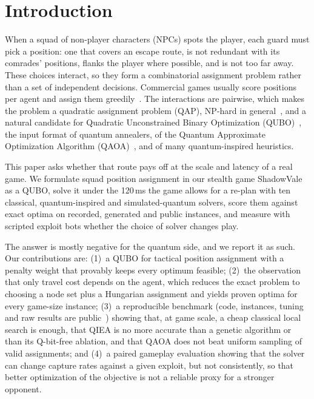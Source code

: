 \documentclass[sigconf]{acmart}
\begin{document}
\section{Introduction}

When a squad of non-player characters (NPCs) spots the player, each guard must pick a position: one
that covers an escape route, is not redundant with its comrades' positions, flanks the player where
possible, and is not too far away. These choices interact, so they form a combinatorial
assignment problem rather than a set of independent decisions. Commercial games usually score
positions per agent and assign them greedily~\cite{Straatman2005,Orkin2006,Jack2013}. The
interactions are pairwise, which makes the problem a quadratic assignment problem (QAP), NP-hard in
general~\cite{Sahni1976}, and a natural candidate for Quadratic Unconstrained Binary Optimization
(QUBO)~\cite{Lucas2014,Glover2019}, the input format of quantum annealers, of the Quantum Approximate
Optimization Algorithm (QAOA)~\cite{Farhi2014}, and of many quantum-inspired heuristics.

This paper asks whether that route pays off at the scale and latency of a real game. We
formulate squad position assignment in our stealth game ShadowVale as a QUBO, solve it under the
120\,ms the game allows for a re-plan with ten classical, quantum-inspired and simulated-quantum
solvers, score them against exact optima on recorded, generated and public instances, and measure
with scripted exploit bots whether the choice of solver changes play.

The answer is mostly negative for the quantum side, and we report it as such. Our contributions are:
(1)~a QUBO for tactical position assignment with a penalty weight that provably keeps every
optimum feasible; (2)~the observation that only travel cost depends on the agent, which reduces the
exact problem to choosing a node set plus a Hungarian assignment and yields proven optima for every
game-size instance; (3)~a reproducible benchmark (code, instances, tuning and raw results are
public~\cite{ShadowValeSolver}) showing that, at game scale, a cheap classical local search is
enough, that QIEA is no more accurate than a genetic algorithm or than its Q-bit-free ablation, and
that QAOA does not beat uniform sampling of valid assignments; and (4)~a paired gameplay evaluation
showing that the solver can change capture rates against a given exploit, but not consistently, so
that better optimization of the objective is not a reliable proxy for a stronger opponent.
\end{document}

